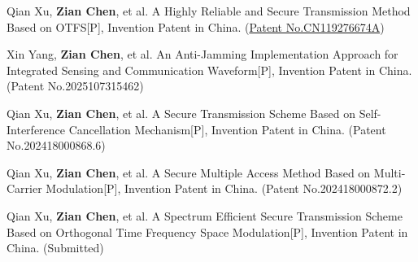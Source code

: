 \documentclass[10pt, letterpaper]{article}
\begin{document}
        \vspace{0.20 cm}
                
        \begin{samepage}
            [$\rm{P_1}$] Qian Xu, \textbf{Zian Chen}, et al. A Highly Reliable and Secure Transmission Method Based on OTFS[P], Invention Patent in China.  (\href{https://patents.glgoo.top/patent/CN119276674A/en}{Patent No.CN119276674A})
        \end{samepage}
        
        \vspace{0.20 cm}
        
        \begin{samepage}
            [$\rm{P_2}$] Xin Yang, \textbf{Zian Chen}, et al. An Anti-Jamming Implementation Approach for Integrated Sensing and Communication Waveform[P], Invention Patent in China. (Patent No.2025107315462)
        \end{samepage}
        
        \vspace{0.20 cm}
        
       \begin{samepage}
            [$\rm{P_3}$] Qian Xu, \textbf{Zian Chen}, et al. A Secure Transmission Scheme Based on Self-Interference Cancellation Mechanism[P], Invention Patent in China. (Patent No.202418000868.6)
        \end{samepage}
        
        \vspace{0.20 cm}
        
        \begin{samepage}
            [$\rm{P_4}$] Qian Xu, \textbf{Zian Chen}, et al. A Secure Multiple Access Method Based on Multi-Carrier Modulation[P], Invention Patent in China. (Patent No.202418000872.2)
        \end{samepage}
        
        \vspace{0.20 cm}
        
        \begin{samepage}
            [$\rm{P_5}$] Qian Xu, \textbf{Zian Chen}, et al. A Spectrum Efficient Secure Transmission Scheme Based on Orthogonal Time Frequency Space Modulation[P], Invention Patent in China. (Submitted)
        \end{samepage}
        
        \vspace{0.20 cm}
        
\end{document}
